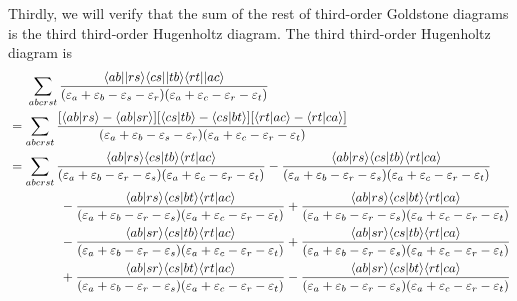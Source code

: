\documentclass[a4paper]{book}
\newcounter{solution}[chapter]
\begin{document}
\begin{solution}
	Thirdly, we will verify that the sum of the rest of third-order Goldstone diagrams is the third third-order Hugenholtz diagram. The third third-order Hugenholtz diagram is	
	\begin{align*}
		&\hspace{1.4em}\sum_{abcrst} \frac{ \langle ab || rs \rangle \langle cs || tb \rangle \langle rt || ac \rangle }{ ( \varepsilon_a + \varepsilon_b - \varepsilon_s - \varepsilon_r ) ( \varepsilon_a + \varepsilon_c - \varepsilon_r - \varepsilon_t ) } \\
		&= \sum_{abcrst} \frac{ [ \langle ab | rs \rangle - \langle ab | sr \rangle ] [ \langle cs | tb \rangle - \langle cs | bt \rangle ] [ \langle rt | ac \rangle - \langle rt | ca \rangle ] }{ ( \varepsilon_a + \varepsilon_b - \varepsilon_s - \varepsilon_r ) ( \varepsilon_a + \varepsilon_c - \varepsilon_r - \varepsilon_t ) } \\
		&= \sum_{abcrst} \frac{ \langle ab | rs \rangle \langle cs | tb \rangle \langle rt | ac \rangle }{ ( \varepsilon_a + \varepsilon_b - \varepsilon_r - \varepsilon_s ) ( \varepsilon_a + \varepsilon_c - \varepsilon_r - \varepsilon_t ) } - \frac{ \langle ab | rs \rangle \langle cs | tb \rangle \langle rt | ca \rangle }{ ( \varepsilon_a + \varepsilon_b - \varepsilon_r - \varepsilon_s ) ( \varepsilon_a + \varepsilon_c - \varepsilon_r - \varepsilon_t ) } \\
		&\hspace{4em} - \frac{ \langle ab | rs \rangle \langle cs | bt \rangle \langle rt | ac \rangle }{ ( \varepsilon_a + \varepsilon_b - \varepsilon_r - \varepsilon_s ) ( \varepsilon_a + \varepsilon_c - \varepsilon_r - \varepsilon_t ) } + \frac{ \langle ab | rs \rangle \langle cs | bt \rangle \langle rt | ca \rangle }{ ( \varepsilon_a + \varepsilon_b - \varepsilon_r - \varepsilon_s ) ( \varepsilon_a + \varepsilon_c - \varepsilon_r - \varepsilon_t ) } \\
		&\hspace{4em} - \frac{ \langle ab | sr \rangle \langle cs | tb \rangle \langle rt | ac \rangle }{ ( \varepsilon_a + \varepsilon_b - \varepsilon_r - \varepsilon_s ) ( \varepsilon_a + \varepsilon_c - \varepsilon_r - \varepsilon_t ) } + \frac{ \langle ab | sr \rangle \langle cs | tb \rangle \langle rt | ca \rangle }{ ( \varepsilon_a + \varepsilon_b - \varepsilon_r - \varepsilon_s ) ( \varepsilon_a + \varepsilon_c - \varepsilon_r - \varepsilon_t ) } \\
		&\hspace{4em} + \frac{ \langle ab | sr \rangle \langle cs | bt \rangle \langle rt | ac \rangle }{ ( \varepsilon_a + \varepsilon_b - \varepsilon_r - \varepsilon_s ) ( \varepsilon_a + \varepsilon_c - \varepsilon_r - \varepsilon_t ) } - \frac{ \langle ab | sr \rangle \langle cs | bt \rangle \langle rt | ca \rangle }{ ( \varepsilon_a + \varepsilon_b - \varepsilon_r - \varepsilon_s ) ( \varepsilon_a + \varepsilon_c - \varepsilon_r - \varepsilon_t ) } \\

\end{align*}
\end{solution}
\end{document}
